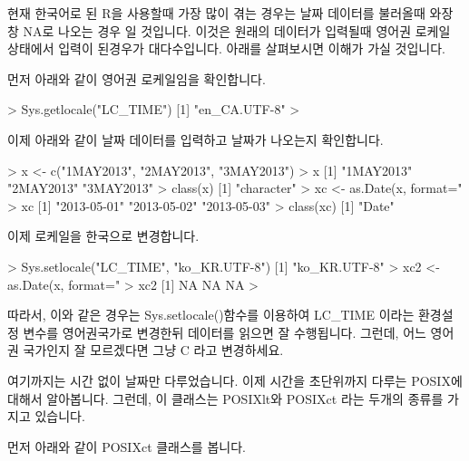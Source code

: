 현재 한국어로 된 R을 사용할때 가장 많이 겪는 경우는 날짜 데이터를 불러올때 와장창 NA로 나오는 경우 일 것입니다. 
이것은 원래의 데이터가 입력될때 영어권 로케일 상태에서 입력이 된경우가 대다수입니다. 
아래를 살펴보시면 이해가 가실 것입니다. 


먼저 아래와 같이 영어권 로케일임을 확인합니다. 

\begin{Schunk}
\begin{Soutput} 
> Sys.getlocale("LC_TIME")
[1] "en_CA.UTF-8"
> 
\end{Soutput}
\end{Schunk}

이제 아래와 같이 날짜 데이터를 입력하고 날짜가 나오는지 확인합니다. 

\begin{Schunk}
\begin{Soutput} 
> x <- c("1MAY2013", "2MAY2013", "3MAY2013")
> x
[1] "1MAY2013" "2MAY2013" "3MAY2013"
> class(x)
[1] "character"
> xc <- as.Date(x, format="%d%B%Y")
> xc
[1] "2013-05-01" "2013-05-02" "2013-05-03"
> class(xc)
[1] "Date"
\end{Soutput}
\end{Schunk}

이제 로케일을 한국으로 변경합니다. 

\begin{Schunk}
\begin{Soutput} 
> Sys.setlocale("LC_TIME", "ko_KR.UTF-8")
[1] "ko_KR.UTF-8"
> xc2 <- as.Date(x, format="%d%B%Y")
> xc2
[1] NA NA NA
> 
\end{Soutput}
\end{Schunk}

따라서, 이와 같은 경우는 Sys.setlocale()함수를 이용하여 LC\_TIME 이라는 환경설정 변수를 영어권국가로 변경한뒤 데이터를 읽으면 잘 수행됩니다. 
그런데, 어느 영어권 국가인지 잘 모르겠다면 그냥 C 라고 변경하세요. 


여기까지는 시간 없이 날짜만 다루었습니다.
이제 시간을 초단위까지 다루는 POSIX에 대해서 알아봅니다.
그런데, 이 클래스는 POSIXlt와 POSIXct 라는 두개의 종류를 가지고 있습니다.

먼저 아래와 같이 POSIXct 클래스를 봅니다. 

\begin{Schunk}
\end{Schunk}

